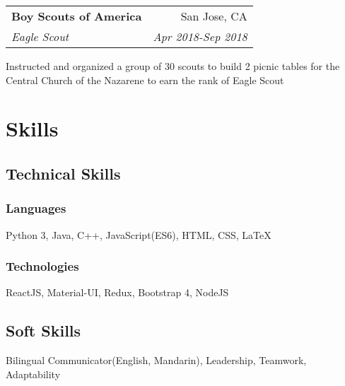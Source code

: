 \documentclass[letterpaper,8pt]{article}
\makeatletter
\newcommand{\resumeSubheading}[4]{
  \vspace{0.25em}
  \begin{tabular*}{0.97\textwidth}[t]{l@{\extracolsep{\fill}}r}
    \textbf{#1} & #2 \\
    \textit{#3} & \textit{#4} \\
  \end{tabular*}\vspace{0.25em}
}
\makeatother
\begin{document}
\resumeSubheading{Boy Scouts of America}
{San Jose, CA}{Eagle Scout}{Apr 2018-Sep 2018}

Instructed and organized a group of 30 scouts to build 2 picnic tables for the Central Church of the Nazarene to earn the rank of Eagle Scout

\section{Skills}

\begin{multicols}{2}
\subsection{Technical Skills}

\subsubsection{Languages}

\begin{adjustwidth}{4em}{}
Python 3, Java, C++, JavaScript(ES6), HTML, CSS, {\LaTeX}
\end{adjustwidth}

\subsubsection{Technologies}

\begin{adjustwidth}{4em}{}
ReactJS, Material-UI, Redux, Bootstrap 4, NodeJS
\end{adjustwidth}

\columnbreak

\subsection{Soft Skills}

\begin{adjustwidth}{2em}{}
Bilingual Communicator(English, Mandarin), Leadership, Teamwork, Adaptability
\end{adjustwidth}

\end{multicols}
\end{document}
